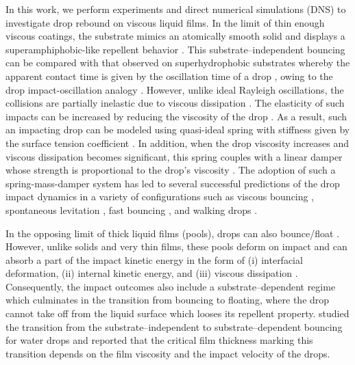In this work, we perform experiments and direct numerical simulations (DNS) to investigate drop rebound on viscous liquid films. In the limit of thin enough viscous coatings, the substrate mimics an atomically smooth solid and displays a superamphiphobic-like repellent behavior \citep{hao2015superhydrophobic, lo2017mechanism}. This substrate--independent bouncing \citep{gilet2012droplets, lo2017mechanism, pack2017failure, lakshman2021deformation} can be compared with that observed on superhydrophobic substrates whereby the apparent contact time is given by the oscillation time of a drop \citep{rayleigh1879capillary}, owing to the drop impact-oscillation analogy \citep{richard2002contact}. However, unlike ideal Rayleigh oscillations, the collisions are partially inelastic due to viscous dissipation \citep{prosperetti1977viscous}. The elasticity of such impacts can be increased by reducing the viscosity of the drop \citep{richard2000bouncing, richard2002contact}. As a result, such an impacting drop can be modeled using quasi-ideal spring with stiffness given by the surface tension coefficient \citep{okumura2003water}. In addition, when the drop viscosity increases and viscous dissipation becomes significant, this spring couples with a linear damper whose strength is proportional to the drop's viscosity \citep[see appendix~\ref{app:SubstrateIndependentBouncing}, and][]{jha2020viscous}. The adoption of such a spring-mass-damper system has led to several successful predictions of the drop impact dynamics in a variety of configurations such as viscous bouncing \citep{molavcek2012quasi, jha2020viscous}, spontaneous levitation \citep{schutzius2015spontaneous}, fast bouncing \citep{chantelot2018drop}, and walking drops \citep{terwagne2013role}. 

In the opposing limit of thick liquid films (pools), drops can also bounce/float \citep{reynolds1881floating, jayaratne1964coalescence}. However, unlike solids and very thin films, these pools deform on impact and can absorb a part of the impact kinetic energy in the form of (i) interfacial deformation, (ii) internal kinetic energy, and (iii) viscous dissipation \citep{galeano2021capillary}. Consequently, the impact outcomes also include a substrate--dependent regime which culminates in the transition from bouncing to floating, where the drop cannot take off from the liquid surface which looses its repellent property. \citet{hao2015superhydrophobic} studied the transition from the substrate--independent to substrate--dependent bouncing for water drops and reported that the critical film thickness marking this transition depends on the film viscosity and the impact velocity of the drops.

